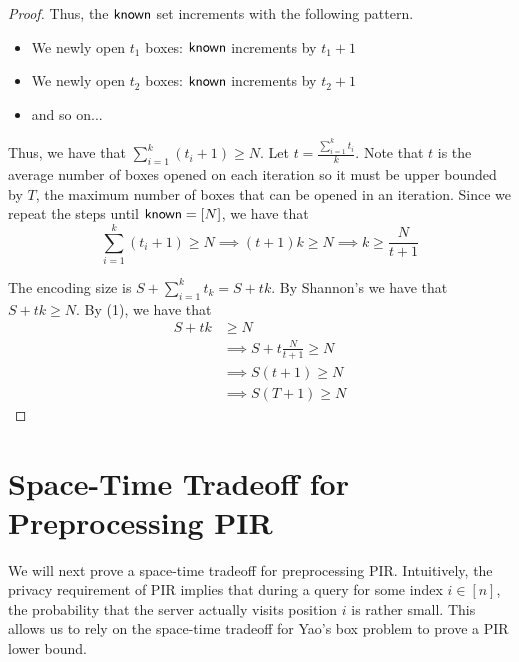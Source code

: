{\begin{proof}
    Thus, the ${\sf known}$ set increments with the following pattern.

    \begin{itemize}
        \item We newly open $t_1$ boxes: ${\sf known}$ increments by $t_1 + 1$
        \item We newly open $t_2$ boxes: ${\sf known}$ increments by $t_2 + 1$
        \item and so on...
    \end{itemize}

    Thus, we have that $\sum_{i = 1}^k (t_i + 1)\ge N$. Let $t = \frac{\sum_{i = 1}^k t_i}{k}$. Note that $t$ is the average number of boxes opened on each iteration so it must be upper bounded by $T$, the maximum number of boxes that can be opened in an iteration. Since we repeat the steps until ${\sf known} = [N]$, we have that
    \[\sum_{i = 1}^k (t_i + 1)\ge N \implies (t+1)k \ge N \implies k\ge \frac{N}{t+1} \tag{1}\]

    The encoding size is $S + \sum_{i=1}^k t_k = S + tk$. By Shannon's we have that $S + tk \ge N$. By (1), we have that 
    \begin{align*}
        S + tk &\ge N \\
        &\implies S + t \frac{N}{t+1} \ge N \tag{By (1)}\\
        &\implies S(t+1) \ge N \tag{Simplification}\\
        &\implies S(T+1) \ge N \tag{As $t \le T$}
    \end{align*}
\end{proof}
}

\section{Space-Time Tradeoff for Preprocessing PIR}
We will next prove a space-time tradeoff for preprocessing PIR.
Intuitively, the privacy requirement of PIR 
implies that during a query for some index $i \in [n]$,
the probability that the server actually visits position $i$
is rather small.
This allows us to  
rely on the space-time tradeoff for Yao's box problem
to prove a PIR lower bound.


